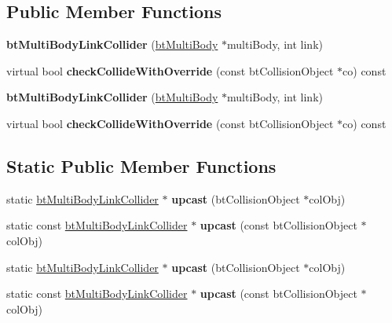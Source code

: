 \subsection*{Public Member Functions}
\begin{DoxyCompactItemize}
\item 
\mbox{\label{classbtMultiBodyLinkCollider_a0d29921517b629bac94bd559b5fc3061}} 
{\bfseries bt\+Multi\+Body\+Link\+Collider} (\hyperlink{classbtMultiBody}{bt\+Multi\+Body} $\ast$multi\+Body, int link)
\item 
\mbox{\label{classbtMultiBodyLinkCollider_a80213215d4b7ce3a31861bcdf10e87b9}} 
virtual bool {\bfseries check\+Collide\+With\+Override} (const bt\+Collision\+Object $\ast$co) const
\item 
\mbox{\label{classbtMultiBodyLinkCollider_a0d29921517b629bac94bd559b5fc3061}} 
{\bfseries bt\+Multi\+Body\+Link\+Collider} (\hyperlink{classbtMultiBody}{bt\+Multi\+Body} $\ast$multi\+Body, int link)
\item 
\mbox{\label{classbtMultiBodyLinkCollider_a80213215d4b7ce3a31861bcdf10e87b9}} 
virtual bool {\bfseries check\+Collide\+With\+Override} (const bt\+Collision\+Object $\ast$co) const
\end{DoxyCompactItemize}
\subsection*{Static Public Member Functions}
\begin{DoxyCompactItemize}
\item 
\mbox{\label{classbtMultiBodyLinkCollider_aa667b2f40a74aa2cb7c04202af71fa36}} 
static \hyperlink{classbtMultiBodyLinkCollider}{bt\+Multi\+Body\+Link\+Collider} $\ast$ {\bfseries upcast} (bt\+Collision\+Object $\ast$col\+Obj)
\item 
\mbox{\label{classbtMultiBodyLinkCollider_a7bbb9cd2e18f2b262e65c6651b58dc01}} 
static const \hyperlink{classbtMultiBodyLinkCollider}{bt\+Multi\+Body\+Link\+Collider} $\ast$ {\bfseries upcast} (const bt\+Collision\+Object $\ast$col\+Obj)
\item 
\mbox{\label{classbtMultiBodyLinkCollider_aa667b2f40a74aa2cb7c04202af71fa36}} 
static \hyperlink{classbtMultiBodyLinkCollider}{bt\+Multi\+Body\+Link\+Collider} $\ast$ {\bfseries upcast} (bt\+Collision\+Object $\ast$col\+Obj)
\item 
\mbox{\label{classbtMultiBodyLinkCollider_a7bbb9cd2e18f2b262e65c6651b58dc01}} 
static const \hyperlink{classbtMultiBodyLinkCollider}{bt\+Multi\+Body\+Link\+Collider} $\ast$ {\bfseries upcast} (const bt\+Collision\+Object $\ast$col\+Obj)
\end{DoxyCompactItemize}
